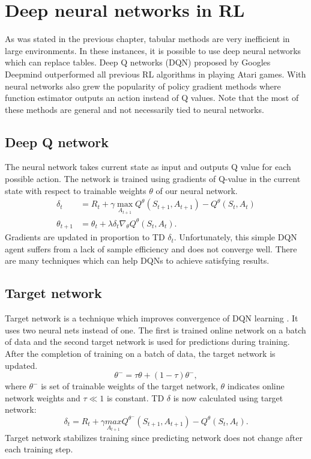 \section{Deep neural networks in RL}
As was stated in the previous chapter, tabular methods are very inefficient in large environments. In these instances, it is possible to use deep neural networks which can replace tables. Deep Q networks (DQN) proposed by Googles Deepmind \cite{mnih2015} outperformed all previous RL algorithms in playing Atari games. With neural networks also grew the popularity of policy gradient methods where function estimator outputs an action instead of Q values. Note that the most of these methods are general and not necessarily tied to neural networks.

\subsection{Deep Q network}
The neural network takes current state as input and outputs Q value for each possible action. The network is trained using gradients of Q-value in the current state with respect to trainable weights $\theta$ of our neural network.
\begin{align} \label{eq:qlearn}
\delta_t &= R_{t} + \gamma \underset{A_{t+1}}{\max}Q^\theta(S_{t+1}, A_{t+1}) - Q^\theta(S_t, A_t)\\
\theta_{t+1} &= \theta_t + \lambda \delta_t \nabla_\theta Q^\theta (S_t, A_t).
\end{align}
Gradients are updated in proportion to TD $\delta_t$. Unfortunately, this simple DQN agent suffers from a lack of sample efficiency and does not converge well. There are many techniques which can help DQNs to achieve satisfying results.

\subsection{Target network}
Target network is a technique which improves convergence of DQN learning \cite{mnih2015}. It uses two neural nets instead of one. The first is trained online network on a batch of data and the second target network is used for predictions during training. After the completion of training on a batch of data, the target network is updated.
\begin{equation}
\theta^- = \tau \theta + (1-\tau)\theta^-,
\end{equation}
where $\theta^-$ is set of trainable weights of the target network, $\theta$ indicates online network weights and $\tau \ll 1$ is constant.
TD $\delta$ is now calculated using target network:
\begin{equation}
\delta_t = R_{t} + \gamma \underset{A_{t+1}}{max}Q^{\theta^-}(S_{t+1}, A_{t+1}) - Q^\theta(S_t, A_t). 
\end{equation}
Target network stabilizes training since predicting network does not change after each training step.

